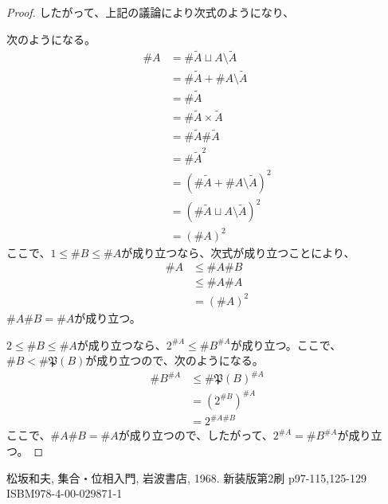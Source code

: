 \documentclass[dvipdfmx]{jsarticle}
\begin{document}
\begin{proof}
したがって、上記の議論により次式のようになり、
\begin{center}
\end{center}
次のようになる。
\begin{align*}
\# A &= \# {\widetilde{A} \sqcup A \setminus \widetilde{A}}\\
&= \# \widetilde{A} + \# {A \setminus \widetilde{A}}\\
&= \# \widetilde{A}\\
&= \# {\widetilde{A} \times \widetilde{A}}\\
&= \# \widetilde{A}\# \widetilde{A}\\
&= {\# \widetilde{A}}^{2}\\
&= \left( \# \widetilde{A} + \# {A \setminus \widetilde{A}} \right)^{2}\\
&= \left( \# {\widetilde{A} \sqcup A \setminus \widetilde{A}} \right)^{2}\\
&= \left( \# A \right)^{2}
\end{align*}
ここで、$1 \leq \# B \leq \# A$が成り立つなら、次式が成り立つことにより、
\begin{align*}
\# A &\leq \# A\# B\\
&\leq \# A\# A\\
&= \left( \# A \right)^{2}
\end{align*}
$\# A\# B = \# A$が成り立つ。\par
$2 \leq \# B \leq \# A$が成り立つなら、$2^{\# A} \leq {\# B}^{\# A}$が成り立つ。ここで、$\# B < \# {\mathfrak{P}(B)}$が成り立つので、次のようになる。
\begin{align*}
{\# B}^{\# A} &\leq {\# {\mathfrak{P}(B)}}^{\# A}\\
&= \left( 2^{\# B} \right)^{\# A}\\
&= 2^{\# A\# B}
\end{align*}
ここで、$\# A\# B = \# A$が成り立つので、したがって、$2^{\# A} = {\# B}^{\# A}$が成り立つ。
\end{proof}
\begin{thebibliography}{50}
    松坂和夫, 集合・位相入門, 岩波書店, 1968. 新装版第2刷 p97-115,125-129 ISBM978-4-00-029871-1
\end{thebibliography}
\end{document}
